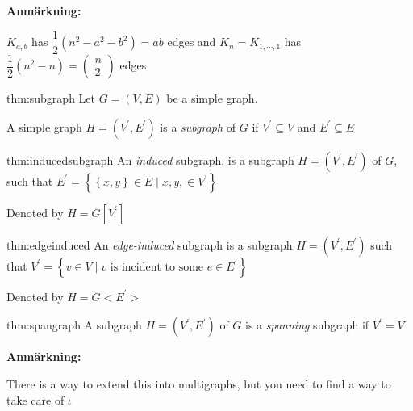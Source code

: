 \par\bigskip
\noindent\textbf{Anmärkning:}\par
\noindent $K_{a,b}$ has $\dfrac{1}{2}(n^2-a^2-b^2) = ab$ edges and $K_n = K_{1,\cdots,1}$ has $\dfrac{1}{2}(n^2-n) = \begin{pmatrix}n\\2\end{pmatrix}$ edges
\par\bigskip
\begin{theo}[Subgraph]{thm:subgraph}
  Let $G = (V,E)$ be a simple graph.\par
  \noindent A simple graph $H = (V^{\prime}, E^{\prime})$ is a \textit{subgraph} of $G$ if $V^{\prime}\subseteq V$ and $E^{\prime}\subseteq E$
\end{theo}
\par\bigskip
\begin{theo}{thm:inducedsubgraph}
  An \textit{induced} subgraph, is a subgraph $H = (V^{\prime}, E^{\prime})$ of $G$, such that $E^{\prime} = \left\{\left\{x,y\right\}\in E\;|\; x,y,\in V^{\prime}\right\}$
  \par\bigskip
  \noindent Denoted by $H = G[V^{\prime}]$
\end{theo}
\par\bigskip
\begin{theo}{thm:edgeinduced}
  An \textit{edge-induced} subgraph is a subgraph $H = (V^{\prime}, E^{\prime})$ such that $V^{\prime} = \left\{v \in V\;|\; v\text{ is incident to some } e\in E^{\prime}\right\}$
  \par\bigskip
  \noindent Denoted by $H = G<E^{\prime}>$
\end{theo}
\par\bigskip
\begin{theo}{thm:spangraph}
  A subgraph $H = (V^{\prime}, E^{\prime})$ of $G$ is a \textit{spanning} subgraph if $V^{\prime} = V$
\end{theo}
\par\bigskip
\noindent\textbf{Anmärkning:}\par
\noindent There is a way to extend this into multigraphs, but you need to find a way to take care of $\iota$ 
